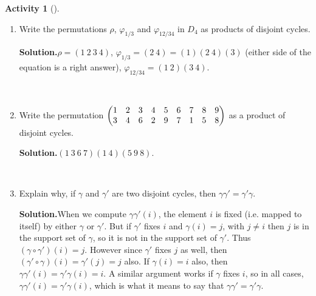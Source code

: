 \documentclass[10pt,]{book}
\theoremstyle{plain}
\theoremstyle{definition}
\newtheorem{activity}[project]{Activity}
\numberwithin{equation}{chapter}
\newcommand{\amp}{&}
\begin{document}
\begin{activity}[]\label{disjoint-commutative}
~\par
\begin{enumerate}[label=(\alph*)]
 \item Write the permutations \(\rho\), \(\varphi_{1/3}\) and \(\varphi_{12/34}\) in \(D_4\) as products of disjoint cycles.%
\par\medskip\noindent%
\textbf{Solution.}\quad \(\rho = (1\ 2\ 3\ 4)\), \(\varphi_{1/3} = (2\ 4) = (1)(2\ 4)(3)\) (either side of the equation is a right answer), \(\varphi_{12/34} = (1\ 2)(3\        4)\).%

~\par
\item Write the permutation \(\begin{pmatrix}1\amp 2\amp 3\amp 4\amp 5\amp 6\amp 7\amp 8\amp 9\cr
3\amp 4\amp 6\amp 2\amp 9\amp 7\amp 1\amp 5\amp 8
\end{pmatrix}\) as a product of disjoint cycles.%
\par\medskip\noindent%
\textbf{Solution.}\quad \((1\ 3\ 6\ 7)(1\ 4)(5\ 9\ 8)\).%

~\par
\item Explain why, if \(\gamma\) and \(\gamma'\) are two disjoint cycles, then \(\gamma\gamma' =
\gamma'\gamma\).%
\par\medskip\noindent%
\textbf{Solution.}\quad When we compute \(\gamma\gamma'(i)\), the element \(i\) is fixed (i.e. mapped to itself) by either \(\gamma\) or \(\gamma'\). But if \(\gamma'\) fixes \(i\) and \(\gamma(i)=j\), with \(j\not=i\) then \(j\) is in the support set of \(\gamma\), so it is not in the support set of \(\gamma'\). Thus \((\gamma\circ\gamma')(i) =j\). However since \(\gamma'\) fixes \(j\) as well, then \((\gamma'\circ\gamma)(i) =\gamma'(j) =j\) also. If \(\gamma(i)=i\) also, then \(\gamma\gamma'(i) =\gamma'\gamma(i) = i\). A similar argument works if \(\gamma\) fixes \(i\), so in all cases, \(\gamma\gamma'(i) = \gamma'\gamma(i)\), which is what it means to say that \(\gamma\gamma'=\gamma'\gamma\).%

\end{enumerate}
\end{activity}
\end{document}
